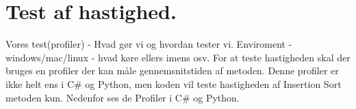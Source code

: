 \documentclass[class=report, crop=false]{standalone}
\begin{document}
    \section{Test af hastighed.}
    Vores test(profiler) -\> Hvad gør vi og hvordan tester vi. Enviroment - windows/mac/linux - hvad køre ellers imens osv.
    For at teste hastigheden skal der bruges en profiler der kan måle gennemsnitstiden af metoden. Denne profiler er ikke helt ens i C\# og Python, men koden vil teste hastigheden af Insertion Sort metoden kun. Nedenfor ses de Profiler i C\# og Python.
    \begin{tcolorbox}
        \lstset{style=codestyle}
        C}, lastline=22, caption=C\# Profiler]{Kode/Profiler.cs}
    \end{tcolorbox}
    \begin{tcolorbox}
        \lstset{style=codestyle}
        
    \end{tcolorbox}
\end{document}
